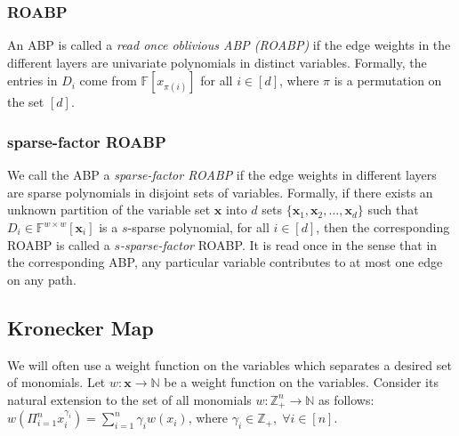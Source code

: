 \documentclass[final,oneeqnum, onethmnum, onefignum]{siamltex1213}
\newcommand{\N}{\mathbb N}
\newcommand{\Zp}{\mathbb{Z}_+}
\newcommand{\F}{\mathbb F}
\newcommand{\lis}[3]{{#1}_1 #2 {#1}_2 #2\dots #2 {#1}_{#3}}
\begin{document}
\subsubsection*{ROABP} An ABP is called a {\em read once oblivious ABP (ROABP)}
if the edge weights in the different layers 
are univariate polynomials in distinct variables.
Formally, the entries in $D_{i}$ come from $\F[x_{\pi(i)}]$
for all $i \in [d]$, where $\pi$ is a permutation on the set $[d]$.

\subsubsection*{sparse-factor ROABP} 
We call the ABP a {\em sparse-factor ROABP} if the edge weights in different
layers are sparse polynomials in disjoint sets of variables.
Formally, 
if there exists an unknown partition of the variable set $\mathbf{x}$
into $d$ sets $\{\lis{\mathbf{x}}{,}{d}\}$
such that
$D_{i} \in \F^{w \times w}[{\mathbf{x}}_{i}]$ is a $s$-sparse polynomial,
for all $i \in [d]$,
then the corresponding ROABP is called a {\em $s$-sparse-factor} ROABP.
It is read once in the sense that in the corresponding 
ABP, any particular variable contributes to at most one edge 
on any path.

\subsection{Kronecker Map}
We will often use a weight function on the variables which separates 
a desired set of monomials. 
Let $w \colon {\mathbf x} \to \N$ be a weight function on the variables. 
Consider its natural extension to the set of all monomials 
$w \colon \Zp^n \to \N$ as follows: 
$w(\Pi_{i=1}^n x_i^{\gamma_i}) = \sum_{i=1}^n \gamma_i w(x_i)$, 
where $\gamma_i \in \Zp , \; \forall i \in [n]$. 
\end{document}
